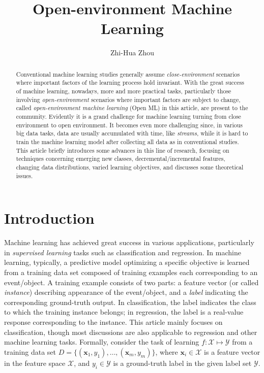\documentclass[review,11pt]{ReportTemplate}
\begin{document}
\begin{frontmatter}
\title{Open-environment Machine Learning}

\author{Zhi-Hua Zhou}
\address{National Key Laboratory for Novel Software Technology\\ Nanjing University, Nanjing 210023, China\\
\rm{zhouzh@nju.edu.cn}}


\begin{abstract} 
Conventional machine learning studies generally assume \textit{close-environment} scenarios where important factors of the learning process hold invariant. With the great success of machine learning, nowadays, more and more practical tasks, particularly those involving \textit{open-environment} scenarios where important factors are subject to change, called \textit{open-environment machine learning} (Open ML) in this article, are present to the community. Evidently it is a grand challenge for machine learning turning from close environment to open environment. It becomes even more challenging since, in various big data tasks, data are usually accumulated with time, like \textit{streams}, while it is hard to train the machine learning model after collecting all data as in conventional studies. This article briefly introduces some advances in this line of research, focusing on techniques concerning emerging new classes, decremental/incremental features, changing data distributions, varied learning objectives, and discusses some theoretical issues.
\end{abstract} 
\end{frontmatter}

\section{Introduction}\label{sec:intro}

Machine learning has achieved great success in various applications, particularly in \textit{supervised learning} tasks such as classification and regression. In machine learning, typically, a predictive model optimizing a specific objective is learned from a training data set composed of training examples each corresponding to an event/object. A training example consists of two parts: a feature vector (or called \textit{instance}) describing appearance of the event/object, and a \textit{label} indicating the corresponding ground-truth output. In classification, the label indicates the class to which the training instance belongs; in regression, the label is a real-value response corresponding to the instance. This article mainly focuses on classification, though most discussions are also applicable to regression and other machine learning tasks. Formally, consider the task of learning $f: \mathcal{X} \mapsto \mathcal{Y}$ from a training data set $D = \{(\bm{x}_1, y_1), \ldots, (\bm{x}_m, y_m)\}$, where $\bm{x}_i \in \mathcal{X}$ is a feature vector in the feature space $\mathcal{X}$, and $y_i \in \mathcal{Y}$ is a ground-truth label in the given label set $\mathcal{Y}$.
\end{document}
